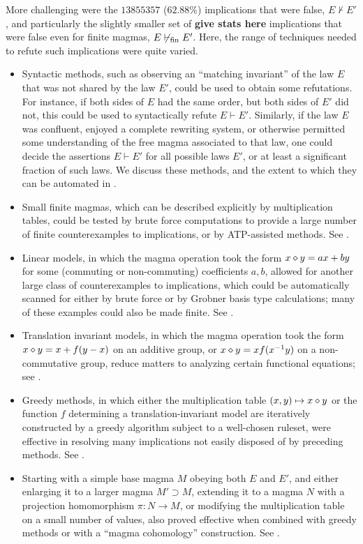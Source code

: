 More challenging were the $13855357$ ($62.88\%$) implications that were false, $E \not \vdash E'$, and particularly the slightly smaller set of {\bf give stats here} implications that were false even for finite magmas, $E \not \vdash_{\mathrm{fin}} E'$. Here, the range of techniques needed to refute such implications were quite varied.
\begin{itemize}
        \item Syntactic methods, such as observing an ``matching invariant'' of the law $E$ that was not shared by the law $E'$, could be used to obtain some refutations.  For instance, if both sides of $E$ had the same order, but both sides of $E'$ did not, this could be used to syntactically refute $E \vdash E'$.  Similarly, if the law $E$ was confluent, enjoyed a complete rewriting system, or otherwise permitted some understanding of the free magma associated to that law, one could decide the assertions $E \vdash E'$ for all possible laws $E'$, or at least a significant fraction of such laws.  We discuss these methods, and the extent to which they can be automated in .
        \item Small finite magmas, which can be described explicitly by multiplication tables, could be tested by brute force computations to provide a large number of finite counterexamples to implications, or by ATP-assisted methods. See .
        \item Linear models, in which the magma operation took the form $x \diamond y = ax + by$ for some (commuting or non-commuting) coefficients $a,b$, allowed for another large class of counterexamples to implications, which could be automatically scanned for either by brute force or by Grobner basis type calculations; many of these examples could also be made finite. See .
        \item Translation invariant models, in which the magma operation took the form $x \diamond y = x + f(y-x)$ on an additive group, or $x \diamond y = x f(x^{-1} y)$ on a non-commutative group, reduce matters to analyzing certain functional equations; see .
        \item Greedy methods, in which either the multiplication table $(x,y) \mapsto x \diamond y$ or the function $f$ determining a translation-invariant model are iteratively constructed by a greedy algorithm subject to a well-chosen ruleset, were effective in resolving many implications not easily disposed of by preceding methods. See .
        \item Starting with a simple base magma $M$ obeying both $E$ and $E'$, and either enlarging it to a larger magma $M' \supset M$, extending it to a magma $N$ with a projection homomorphism $\pi: N \to M$, or modifying the multiplication table on a small number of values, also proved effective when combined with greedy methods or with a ``magma cohomology'' construction. See .

\end{itemize}
